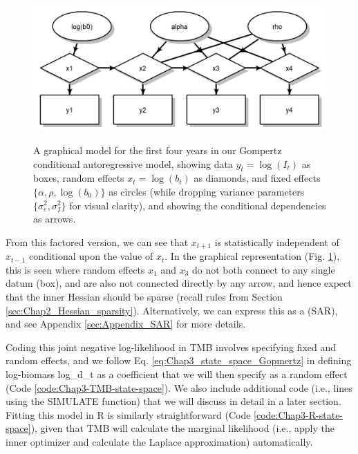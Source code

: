\begin{figure}[!ht]
    \caption[Graphical model for first-order autoregressive process]{A graphical model for the first four years in our Gompertz conditional autoregressive model, showing data \(y_t = \log(I_t)\) as boxes, random effects \(x_t = \log(b_t)\) as diamonds, and fixed effects \(\{\alpha,\rho,\log(b_0)\}\) as circles (while dropping variance parameters \(\{\sigma_{\epsilon}^2,\sigma_I^2\}\) for visual clarity), and showing the conditional dependencies as arrows.}
    \centering
    \includegraphics[width=5.5in]{Chap_3/graph.png}
    \label{fig:Chap3_gompertz_graph}
\end{figure}
From this factored version, we can see that \(x_{t+1}\) is statistically independent of \(x_{t-1}\) conditional upon the value of \(x_t\).  In the graphical representation (Fig. \ref{fig:Chap3_gompertz_graph}), this is seen where random effects \(x_1\) and \(x_3\) do not both connect to any single datum (box), and are also not connected directly by any arrow, and hence expect that the inner Hessian should be sparse (recall rules from Section \ref{sec:Chap2_Hessian_sparsity}).  Alternatively, we can express this as a  (SAR), and see Appendix \ref{sec:Appendix_SAR} for more details.  

\lstset{style=TMBcode}


Coding this joint negative log-likelihood in TMB involves specifying fixed and random effects, and we follow Eq. \ref{eq:Chap3_state_space_Gopmertz} in defining log-biomass \colorbox{backblue}{log\_d\_t} as a coefficient that we will then specify as a random effect (Code \ref{code:Chap3-TMB-state-space}).  We also include additional code (i.e., lines using the \colorbox{backblue}{SIMULATE} function) that we will discuss in detail in a later section. Fitting this model in R is similarly straightforward (Code \ref{code:Chap3-R-state-space}), given that TMB will calculate the marginal likelihood (i.e., apply the inner optimizer and calculate the Laplace approximation) automatically. 

